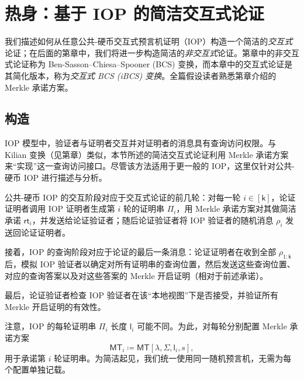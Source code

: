 \documentclass[american,singlepageview]{snargs-book-zh}
\newcommand{\DefineEqual}{\coloneqq}
\newcommand{\ProtoAlphabet}{\Sigma}
\newcommand{\ProtoRoundComplexity}{\mathsf{k}}
\newcommand{\ProtoProofLength}{\mathsf{l}}
\newcommand{\RoundIndex}{i}
\newcommand{\IOPString}{\Pi}
\newcommand{\IOPVerifierRandomMessage}{\rho}
\newcommand{\IOPRoundComplexity}{\ProtoRoundComplexity}
\newcommand{\IOPAlphabet}{\ProtoAlphabet}
\newcommand{\IOPProofLength}{\ProtoProofLength}
\newcommand{\SecurityParameter}{\lambda}
\newcommand{\PrivacyParameter}{s}
\newcommand{\MTSymbol}{\mathsf{MT}}
\newcommand{\MTConstructor}[4]{\MTSymbol[#1,#2,#3,#4]}
\newcommand{\MTCommitment}{\mathsf{rt}}
\begin{document}
\chapter{热身：基于 IOP 的简洁交互式论证}
\label{chapter:ibcs-transformation}

我们描述如何从任意公共-硬币交互式预言机证明（IOP）构造一个简洁的\emph{交互式}论证；在后面的第章中，我们将进一步构造简洁的\emph{非交互式}论证。第章中的非交互式论证称为 Ben-Sasson–Chiesa–Spooner (BCS) 变换，而本章中的交互式论证是其简化版本，称为\emph{交互式 BCS (iBCS) 变换}。全篇假设读者熟悉第章介绍的 Merkle 承诺方案。

\section{构造}
\label{section:ibcs-construction}

IOP 模型中，验证者与证明者交互并对证明者的消息具有查询访问权限。与 Kilian 变换（见第章）类似，本节所述的简洁交互式论证利用 Merkle 承诺方案来“实现”这一查询访问接口。尽管该方法适用于更一般的 IOP，这里仅针对公共-硬币 IOP 进行描述与分析。

公共-硬币 IOP 的交互阶段对应于交互式论证的前几轮：对每一轮 $\RoundIndex\in[\IOPRoundComplexity]$，论证证明者调用 IOP 证明者生成第 $\RoundIndex$ 轮的证明串 $\IOPString_{\RoundIndex}$，用 Merkle 承诺方案对其做简洁承诺 $\MTCommitment_{\RoundIndex}$，并发送给论证验证者；随后论证验证者将 IOP 验证者的随机消息 $\IOPVerifierRandomMessage_{\RoundIndex}$ 发送回论证证明者。

接着，IOP 的查询阶段对应于论证的最后一条消息：论证证明者在收到全部 $\IOPVerifierRandomMessage_{1:\IOPRoundComplexity}$ 后，模拟 IOP 验证者以确定对所有证明串的查询位置，然后发送这些查询位置、对应的查询答案以及对这些答案的 Merkle 开启证明（相对于前述承诺）。

最后，论证验证者检查 IOP 验证者在该“本地视图”下是否接受，并验证所有 Merkle 开启证明的有效性。

注意，IOP 的每轮证明串 $\IOPString_{\RoundIndex}$ 长度 $\IOPProofLength_{\RoundIndex}$ 可能不同。为此，对每轮分别配置 Merkle 承诺方案
\[
  \MTSymbol_{\RoundIndex}\DefineEqual
  \MTConstructor{\SecurityParameter}{\IOPAlphabet}{\IOPProofLength_{\RoundIndex}}{\PrivacyParameter},
\]
用于承诺第 $\RoundIndex$ 轮证明串。为简洁起见，我们统一使用同一随机预言机，无需为每个配置单独记载。
\end{document}
